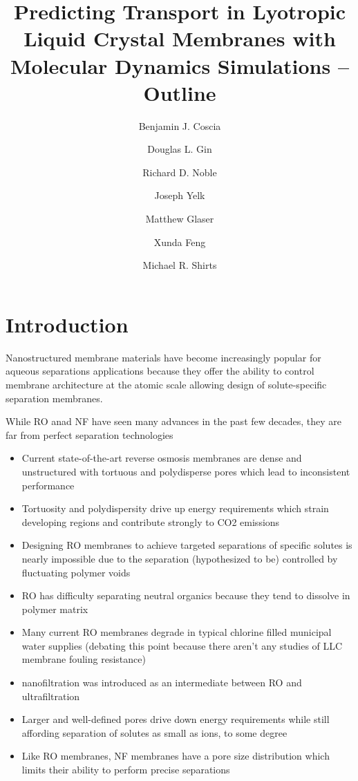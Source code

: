 \documentclass{article}
\title{Predicting Transport in Lyotropic Liquid Crystal Membranes with Molecular Dynamics Simulations -- Outline}
\author{Benjamin J. Coscia \and Douglas L. Gin \and Richard D. Noble \and Joseph Yelk \and Matthew Glaser \and Xunda Feng \and Michael R. Shirts}
\begin{document}
	
	\graphicspath{{./figures/}}
	\maketitle
	\section{Introduction}
	Nanostructured membrane materials have become increasingly popular for aqueous separations applications because they offer the ability to control membrane architecture at the atomic scale allowing design of solute-specific separation membranes.
	
	While RO anad NF have seen many advances in the past few decades, they are far from perfect separation technologies
	\begin{itemize}
		\item Current state-of-the-art reverse osmosis membranes are dense and unstructured with tortuous and polydisperse pores which lead to inconsistent performance
		\item Tortuosity and polydispersity drive up energy requirements which strain developing regions and contribute strongly to CO2 emissions
		\item Designing RO membranes to achieve targeted separations of specific solutes is nearly impossible due to the separation (hypothesized to be) controlled by fluctuating polymer voids
		\item RO has difficulty separating neutral organics because they tend to dissolve in polymer matrix
		\item Many current RO membranes degrade in typical chlorine filled municipal water supplies (debating this point because there aren't any studies of LLC membrane fouling resistance)
		\item nanofiltration was introduced as an intermediate between RO and ultrafiltration
		\item Larger and well-defined pores drive down energy requirements while still affording separation of solutes as small as ions, to some degree
		\item Like RO membranes, NF membranes have a pore size distribution which limits their ability to perform precise separations
	\end{itemize}	
\end{document}
